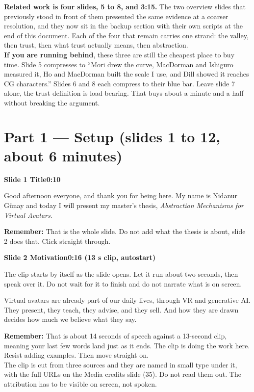 \documentclass[11pt,a4paper]{article}
\newcommand{\slidehead}[3]{%
  \needspace{5\baselineskip}
  \vspace{0.9em}
  \noindent\colorbox{knblue}{\parbox{0.978\textwidth}{\vspace{1pt}\color{white}\textbf{Slide #1 \quad #2}\hfill\textbf{#3}\vspace{1pt}}}
  \vspace{0.35em}\par}
\newcommand{\remind}[1]{%
  \vspace{0.15em}
  \noindent\colorbox{knlight}{\parbox{0.972\textwidth}{\small\color{knblue}\textbf{Remember:} #1}}
  \vspace{0.2em}\par}
\begin{document}
\vspace{0.5em}
\noindent\colorbox{knlight}{\parbox{0.972\textwidth}{\small\color{knblue}
\textbf{Related work is four slides, 5 to 8, and 3:15.} The two overview slides that previously stood in front of them presented the same evidence at a coarser resolution, and they now sit in the backup section with their own scripts at the end of this document. Each of the four that remain carries one strand: the valley, then trust, then what trust actually means, then abstraction.\\[0.4em]
\textbf{If you are running behind}, these three are still the cheapest place to buy time. Slide 5 compresses to ``Mori drew the curve, MacDorman and Ishiguro measured it, Ho and MacDorman built the scale I use, and Dill showed it reaches CG characters.'' Slides 6 and 8 each compress to their blue bar. Leave slide 7 alone, the trust definition is load bearing. That buys about a minute and a half without breaking the argument.}}

\clearpage

\section*{\color{knblue}Part 1 — Setup (slides 1 to 12, about 6 minutes)}

\slidehead{1}{Title}{0:10}

Good afternoon everyone, and thank you for being here. My name is Nidanur Günay and today I will present my master's thesis, \emph{Abstraction Mechanisms for Virtual Avatars}.

\remind{That is the whole slide. Do not add what the thesis is about, slide 2 does that. Click straight through.}

\slidehead{2}{Motivation}{0:16  (13 s clip, autostart)}

The clip starts by itself as the slide opens. Let it run about two seconds, then speak over it. Do not wait for it to finish and do not narrate what is on screen.

Virtual avatars are already part of our daily lives, through VR and generative AI. They present, they teach, they advise, and they sell. And how they are drawn decides how much we believe what they say.

\remind{That is about 14 seconds of speech against a 13-second clip, meaning your last few words land just as it ends. The clip is doing the work here. Resist adding examples. Then move straight on.\\[0.4em] The clip is cut from three sources and they are named in small type under it, with the full URLs on the Media credits slide (35). Do not read them out. The attribution has to be visible on screen, not spoken.}
\end{document}
